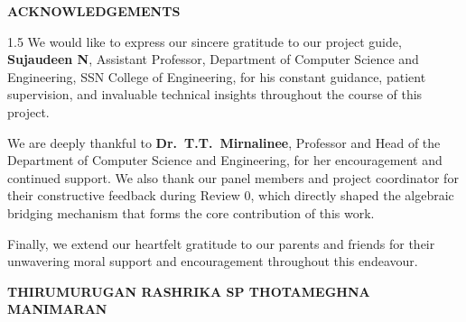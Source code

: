 \documentclass[a4paper, 14pt, oneside]{Thesis}
\begin{document}
\clearpage
\thispagestyle{empty}
\begin{center}
  {\large \bf ACKNOWLEDGEMENTS \par}
  \bigskip
\end{center}
\begin{spacing}{1.5}
We would like to express our sincere gratitude to our project guide,
\textbf{Sujaudeen N}, Assistant Professor, Department of Computer Science
and Engineering, SSN College of Engineering, for his constant guidance,
patient supervision, and invaluable technical insights throughout the course
of this project.

We are deeply thankful to \textbf{Dr.\ T.T.\ Mirnalinee}, Professor and Head
of the Department of Computer Science and Engineering, for her encouragement
and continued support. We also thank our panel members and project coordinator
for their constructive feedback during Review 0, which directly shaped the
algebraic bridging mechanism that forms the core contribution of this work.

Finally, we extend our heartfelt gratitude to our parents and friends for
their unwavering moral support and encouragement throughout this endeavour.
\end{spacing}

\vspace{2.5cm}
\noindent
{\bf THIRUMURUGAN RA}\hfill {\bf SHRIKA SP THOTA}\hfill {\bf MEGHNA MANIMARAN}
\clearpage
\end{document}
